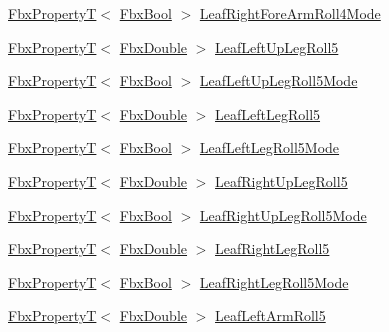 \begin{DoxyCompactItemize}
\item 
\hyperlink{class_fbx_property_t}{Fbx\+PropertyT}$<$ \hyperlink{fbxtypes_8h_a92e0562b2fe33e76a242f498b362262e}{Fbx\+Bool} $>$ \hyperlink{class_fbx_character_a47514db9e67e2b8cf737977951edd431}{Leaf\+Right\+Fore\+Arm\+Roll4\+Mode}
\item 
\hyperlink{class_fbx_property_t}{Fbx\+PropertyT}$<$ \hyperlink{fbxtypes_8h_a171e72a1c46fc15c1a6c9c31948c1c5b}{Fbx\+Double} $>$ \hyperlink{class_fbx_character_a648cfd7497935a537ca77e015c87ab08}{Leaf\+Left\+Up\+Leg\+Roll5}
\item 
\hyperlink{class_fbx_property_t}{Fbx\+PropertyT}$<$ \hyperlink{fbxtypes_8h_a92e0562b2fe33e76a242f498b362262e}{Fbx\+Bool} $>$ \hyperlink{class_fbx_character_ae7b3e26b751dd9d4f69062a4541e4e0c}{Leaf\+Left\+Up\+Leg\+Roll5\+Mode}
\item 
\hyperlink{class_fbx_property_t}{Fbx\+PropertyT}$<$ \hyperlink{fbxtypes_8h_a171e72a1c46fc15c1a6c9c31948c1c5b}{Fbx\+Double} $>$ \hyperlink{class_fbx_character_aaacb001144169bc23af82338a4908f9f}{Leaf\+Left\+Leg\+Roll5}
\item 
\hyperlink{class_fbx_property_t}{Fbx\+PropertyT}$<$ \hyperlink{fbxtypes_8h_a92e0562b2fe33e76a242f498b362262e}{Fbx\+Bool} $>$ \hyperlink{class_fbx_character_a665e7a11aece9fedc4f101c62dd068b1}{Leaf\+Left\+Leg\+Roll5\+Mode}
\item 
\hyperlink{class_fbx_property_t}{Fbx\+PropertyT}$<$ \hyperlink{fbxtypes_8h_a171e72a1c46fc15c1a6c9c31948c1c5b}{Fbx\+Double} $>$ \hyperlink{class_fbx_character_a721b30be79d830818b6402e68352731a}{Leaf\+Right\+Up\+Leg\+Roll5}
\item 
\hyperlink{class_fbx_property_t}{Fbx\+PropertyT}$<$ \hyperlink{fbxtypes_8h_a92e0562b2fe33e76a242f498b362262e}{Fbx\+Bool} $>$ \hyperlink{class_fbx_character_aeed7584d8c5086b9b3deff24abd30b14}{Leaf\+Right\+Up\+Leg\+Roll5\+Mode}
\item 
\hyperlink{class_fbx_property_t}{Fbx\+PropertyT}$<$ \hyperlink{fbxtypes_8h_a171e72a1c46fc15c1a6c9c31948c1c5b}{Fbx\+Double} $>$ \hyperlink{class_fbx_character_a008a02d8cc33a281a0ffc947a20e5cb1}{Leaf\+Right\+Leg\+Roll5}
\item 
\hyperlink{class_fbx_property_t}{Fbx\+PropertyT}$<$ \hyperlink{fbxtypes_8h_a92e0562b2fe33e76a242f498b362262e}{Fbx\+Bool} $>$ \hyperlink{class_fbx_character_a91f415ab396f861adcfbe5468514d7ec}{Leaf\+Right\+Leg\+Roll5\+Mode}
\item 
\hyperlink{class_fbx_property_t}{Fbx\+PropertyT}$<$ \hyperlink{fbxtypes_8h_a171e72a1c46fc15c1a6c9c31948c1c5b}{Fbx\+Double} $>$ \hyperlink{class_fbx_character_afcd2329e11115fd6a891e64a4fe0ba8d}{Leaf\+Left\+Arm\+Roll5}

\end{DoxyCompactItemize}

